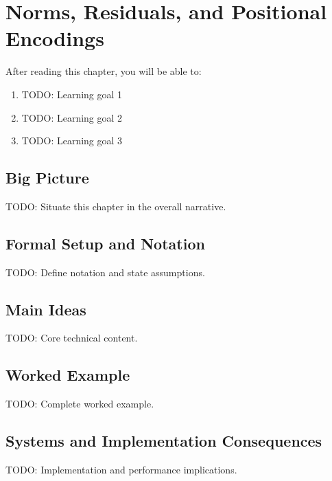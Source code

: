 \chapter{Norms, Residuals, and Positional Encodings}
\label{ch:11}

\begin{keyinsight}
After reading this chapter, you will be able to:
\begin{enumerate}
  \item TODO: Learning goal 1
  \item TODO: Learning goal 2
  \item TODO: Learning goal 3
\end{enumerate}
\end{keyinsight}

\section{Big Picture}
\label{ch:11:sec:big_picture}

TODO: Situate this chapter in the overall narrative.

\section{Formal Setup and Notation}
\label{ch:11:sec:setup}

TODO: Define notation and state assumptions.

\section{Main Ideas}
\label{ch:11:sec:main}

TODO: Core technical content.

\section{Worked Example}
\label{ch:11:sec:example}

TODO: Complete worked example.

\section{Systems and Implementation Consequences}
\label{ch:11:sec:systems}

TODO: Implementation and performance implications.


